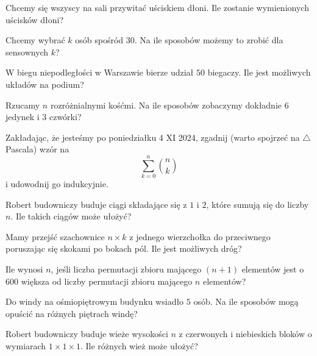 \documentclass{article}
\begin{document}
\begin{zadanie}
  Chcemy się wszyscy na sali przywitać uściskiem dłoni. Ile zostanie wymienionych uścisków dłoni?
\end{zadanie}

\begin{zadanie}
  Chcemy wybrać $k$ osób spośród $30$. Na ile sposobów możemy to zrobić dla sensownych $k$?
\end{zadanie}

\begin{zadanie}
  W biegu niepodległości w Warszawie bierze udział $50$ biegaczy. Ile jest możliwych układów na podium?
\end{zadanie}

\begin{zadanie}
  Rzucamy $n$ rozróżnialnymi kośćmi. Na ile sposobów zobaczymy dokładnie $6$ jedynek i $3$ czwórki?
\end{zadanie}

\begin{zadanie}
  Zakładając, że jesteśmy po poniedziałku 4 XI 2024, zgadnij (warto spojrzeć na $\triangle$ Pascala) wzór na
  $$\sum_{k=0}^n\binom{n}{k}$$
  i udowodnij go indukcyjnie.
\end{zadanie}

\begin{zadanie}
  Robert budowniczy buduje ciągi składające się z $1$ i $2$, które sumują się do liczby $n$. Ile takich ciągów może ułożyć?
\end{zadanie}

\begin{zadanie}
  Mamy przejść szachownice $n\times k$ z jednego wierzchołka do przeciwnego poruszając się skokami po bokach pól. Ile jest możliwych dróg?
\end{zadanie}

\begin{zadanie}
  Ile wynosi $n$, jeśli liczba permutacji zbioru mającego $(n+1)$ elementów jest o $600$ większa od liczby permutacji zbioru mającego $n$ elementów?
\end{zadanie}

\begin{zadanie}
Do windy na ośmiopiętrowym budynku wsiadło $5$ osób. Na ile sposobów mogą opuścić na różnych piętrach windę?
\end{zadanie}

\begin{zadanie}
  Robert budowniczy buduje wieże wysokości $n$ z czerwonych i niebieskich bloków o wymiarach $1\times 1\times 1$. Ile różnych wież może ułożyć? 
\end{zadanie}
  
\end{document}
